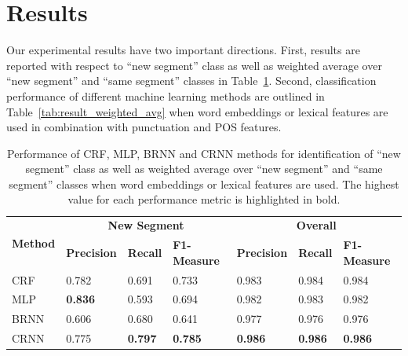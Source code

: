 \documentclass{amia}
\begin{document}
\section*{Results}
Our experimental results have two important directions. First, results are reported with respect to ``new segment'' class as well as weighted average over ``new segment'' and ``same segment'' classes in Table~\ref{tab:result_base}. Second, classification performance of different machine learning methods are outlined in Table~\ref{tab:result_weighted_avg} when word embeddings or lexical features are used in combination with punctuation and POS features.\\

\begin{table}[ht]
\centering
\caption{Performance of CRF, MLP, BRNN and CRNN methods for identification of ``new segment'' class as well as weighted average over ``new segment'' and ``same segment'' classes when word embeddings or lexical features are used. The highest value for each performance metric
is highlighted in bold.}
\label{tab:result_base}
  \begin{tabular}{|l|l|l|l|l|l|l|}
  \hline
   \multirow{2}{*}{\textbf{Method}} & \multicolumn{3}{|c|}{\textbf{New Segment}} & \multicolumn{3}{|c|}{\textbf{Overall}} \\\cline{2-7}
   & \textbf{Precision}  & \textbf{Recall} & \textbf{F1-Measure} & \textbf{Precision}  & \textbf{Recall} & \textbf{F1-Measure} \\ \hline    
 CRF & 0.782 & 0.691 & 0.733 & 0.983 & 0.984 & 0.984 \\ \hline
 MLP & \textbf{0.836} & 0.593 & 0.694 & 0.982 & 0.983 & 0.982 \\ \hline
 BRNN & 0.606 & 0.680 & 0.641 & 0.977 & 0.976 & 0.976 \\ \hline
 CRNN & 0.775 & \textbf{0.797} & \textbf{0.785} & \textbf{0.986} & \textbf{0.986} & \textbf{0.986} \\ \hline
  \end{tabular}
\end{table}                         
\end{document}

